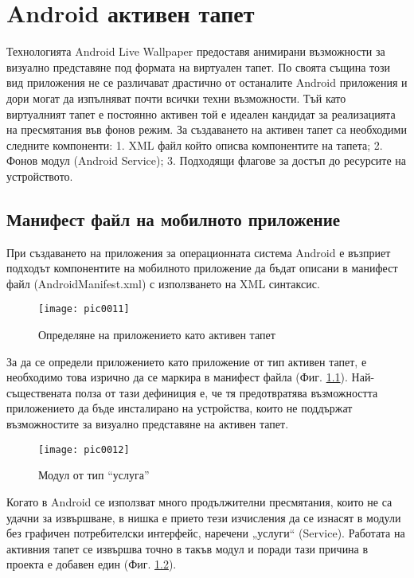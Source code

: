 \newpage
\chapter{Android активен тапет}
\label{chapter04}

Технологията Android Live Wallpaper предоставя анимирани възможности за визуално представяне под формата на виртуален тапет. По своята същина този вид приложения не се различават драстично от останалите Android  приложения и дори могат да изпълняват почти всички техни възможности. Тъй като виртуалният тапет е постоянно активен той е идеален кандидат за реализацията на пресмятания във фонов режим. За създаването на активен тапет са необходими следните компоненти: 1. XML файл който описва компонентите на тапета; 2. Фонов модул (Android Service); 3. Подходящи флагове за достъп до ресурсите на устройството. 

\section{Манифест файл на мобилното приложение}

При създаването на приложения за операционната система Android е възприет подходът компонентите на мобилното приложение да бъдат описани в манифест файл (AndroidManifest.xml) с използването на XML синтаксис. 

\begin{figure}[h]
  \centering
  \texttt{[image: pic0011]}
  \caption{Определяне на приложението като активен тапет}
\label{fig:pic0011}
\end{figure}
\FloatBarrier

За да се определи приложението като приложение от тип активен тапет, е необходимо това изрично да се маркира в манифест файла (Фиг. \ref{fig:pic0011}). Най-съществената полза от тази дефиниция е, че тя предотвратява възможността приложението да бъде инсталирано на устройства, които не поддържат възможностите за визуално представяне на активен тапет. 

\begin{figure}[h]
  \centering
  \texttt{[image: pic0012]}
  \caption{Модул от тип ``услуга''}
\label{fig:pic0012}
\end{figure}
\FloatBarrier

Когато в Android се използват много продължителни пресмятания, които не са удачни за извършване, в нишка е прието тези изчисления да се изнасят в модули без графичен потребителски интерфейс, наречени „услуги“ (Service). Работата на активния тапет се извършва точно в такъв модул и поради тази причина в проекта е добавен един (Фиг. \ref{fig:pic0012}).

